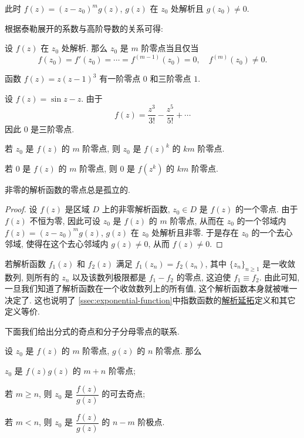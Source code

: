 此时 $f(z)=(z-z_0)^mg(z)$, $g(z)$ 在 $z_0$ 处解析且 $g(z_0)\neq 0$.

根据泰勒展开的系数与高阶导数的关系可得:

\begin{theorem}
  设 $f(z)$ 在 $z_0$ 处解析.
  那么 $z_0$ 是 $m$ 阶零点当且仅当
  \[
    f(z_0)=f'(z_0)=\cdots=f^{(m-1)}(z_0)=0,\quad
    f^{(m)}(z_0)\neq 0.
  \]
\end{theorem}

\begin{exampleenum}
  \item 函数 $f(z)=z(z-1)^3$ 有一阶零点 $0$ 和三阶零点 $1$.
  \item 设 $f(z)=\sin z-z$.
  由于
  \[
    f(z)=\frac{z^3}{3!}-\frac{z^5}{5!}+\cdots
  \]
  因此 $0$ 是三阶零点.
  \item 若 $z_0$ 是 $f(z)$ 的 $m$ 阶零点, 则 $z_0$ 是 $f(z)^k$ 的 $km$ 阶零点.
  \item 若 $0$ 是 $f(z)$ 的 $m$ 阶零点, 则 $0$ 是 $f(z^k)$ 的 $km$ 阶零点.
\end{exampleenum}

\begin{theorem}
  \label{thm:zero-isolated}
  非零的解析函数的零点总是孤立的.
\end{theorem}

\begin{proof}
  设 $f(z)$ 是区域 $D$ 上的非零解析函数, $z_0\in D$ 是 $f(z)$ 的一个零点.
  由于 $f(z)$ 不恒为零, 因此可设 $z_0$ 是 $f(z)$ 的 $m$ 阶零点, 从而在 $z_0$ 的一个邻域内 $f(z)=(z-z_0)^m g(z)$, $g(z)$ 在 $z_0$ 处解析且非零.
  于是存在 $z_0$ 的一个去心邻域, 使得在这个去心邻域内 $g(z)\neq0$, 从而 $f(z)\neq 0$.
\end{proof}

若解析函数 $f_1(z)$ 和 $f_2(z)$ 满足 $f_1(z_n)=f_2(z_n)$, 其中 $\{z_n\}_{n\ge1}$ 是一收敛数列, 则所有的 $z_n$ 以及该数列极限都是 $f_1-f_2$ 的零点, 这迫使 $f_1\equiv f_2$.
由此可知, 一旦我们知道了解析函数在一个收敛数列上的所有值, 这个解析函数本身就被唯一决定了.
这也说明了 \ref{ssec:exponential-function}中指数函数的\hyperref[enum:exp-expansion]{解析延拓}定义和其它定义等价.

下面我们给出分式的奇点和分子分母零点的联系.

\begin{theorem}[可去奇点和极点判定方法]
  设 $z_0$ 是 $f(z)$ 的 $m$ 阶零点, $g(z)$ 的 $n$ 阶零点.
  那么
  \begin{enuma}
    \item $z_0$ 是 $f(z)g(z)$ 的 $m+n$ 阶零点;
    \item 若 $m\ge n$, 则 $z_0$ 是 $\dfrac{f(z)}{g(z)}$ 的可去奇点;
    \item 若 $m<n$, 则 $z_0$ 是 $\dfrac{f(z)}{g(z)}$ 的 $n-m$ 阶极点.
  \end{enuma}
\end{theorem}

